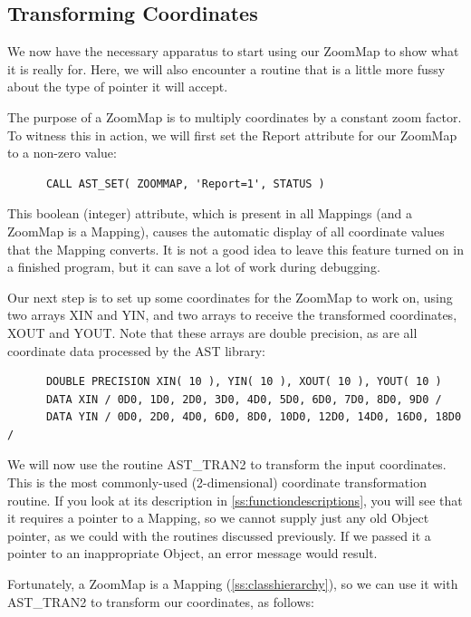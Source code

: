 \documentclass[twoside,11pt]{article}
\newcommand{\htmlref}[2]{#1}
\newcommand{\appref}[1]{Appendix~\ref{#1}}
\renewcommand{\appref}[1]{\ref{#1}}
\begin{document}
\subsection{\label{ss:transforming}Transforming Coordinates}

We now have the necessary apparatus to start using our \htmlref{ZoomMap}{ZoomMap} to show
what it is really for. Here, we will also encounter a routine that is
a little more fussy about the type of pointer it will accept.

The purpose of a ZoomMap is to multiply coordinates by a constant zoom
factor. To witness this in action, we will first set the \htmlref{Report}{Report}
attribute for our ZoomMap to a non-zero value:

\small
\begin{verbatim}
      CALL AST_SET( ZOOMMAP, 'Report=1', STATUS )
\end{verbatim}
\normalsize

This boolean (integer) attribute, which is present in all Mappings
(and a ZoomMap is a \htmlref{Mapping}{Mapping}), causes the automatic display of all
coordinate values that the Mapping converts. It is not a good idea to
leave this feature turned on in a finished program, but it can save a
lot of work during debugging.

Our next step is to set up some coordinates for the ZoomMap to work
on, using two arrays XIN and YIN, and two arrays to receive the
transformed coordinates, XOUT and YOUT.  Note that these arrays are
double precision, as are all coordinate data processed by the AST
library:

\small
\begin{verbatim}
      DOUBLE PRECISION XIN( 10 ), YIN( 10 ), XOUT( 10 ), YOUT( 10 )
      DATA XIN / 0D0, 1D0, 2D0, 3D0, 4D0, 5D0, 6D0, 7D0, 8D0, 9D0 /
      DATA YIN / 0D0, 2D0, 4D0, 6D0, 8D0, 10D0, 12D0, 14D0, 16D0, 18D0 /
\end{verbatim}
\normalsize

We will now use the routine \htmlref{AST\_TRAN2}{AST_TRAN2} to transform the input
coordinates. This is the most commonly-used (2-dimensional) coordinate
transformation routine. If you look at its description in
\appref{ss:functiondescriptions}, you will see that it requires a
pointer to a Mapping, so we cannot supply just any old \htmlref{Object}{Object} pointer,
as we could with the routines discussed previously. If we passed it a
pointer to an inappropriate Object, an error message would result.

Fortunately, a ZoomMap is a Mapping (\appref{ss:classhierarchy}), so we
can use it with AST\_TRAN2 to transform our coordinates, as follows:
\end{document}
